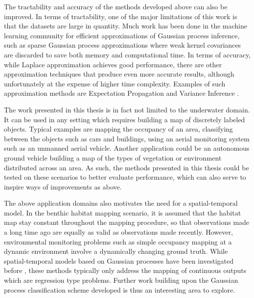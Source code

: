 	The tractability and accuracy of the methods developed above can also be improved. In terms of tractability, one of the major limitations of this work is that the datasets are large in quantity. Much work has been done in the machine learning community for efficient approximations of Gaussian process inference, such as sparse Gaussian process approximations where weak kernel covariances are discarded to save both memory and computational time. In terms of accuracy, while Laplace approximation achieves good performance, there are other approximation techniques that produce even more accurate results, although unfortunately at the expense of higher time complexity. Examples of such approximation methods are Expectation Propagation and Variance Inference \cite{GaussianProcessForMachineLearning}.
	
	The work presented in this thesis is in fact not limited to the underwater domain. It can be used in any setting which requires building a map of discretely labeled objects. Typical examples are mapping the occupancy of an area, classifying between the objects such as cars and buildings, using an aerial monitoring system such as an unmanned aerial vehicle. Another application could be an autonomous ground vehicle building a map of the types of vegetation or environment distributed across an area. As such, the methods presented in this thesis could be tested on these scenarios to better evaluate performance, which can also serve to inspire ways of improvements as above.
	
	The above application domains also motivates the need for a spatial-temporal model. In the benthic habitat mapping scenario, it is assumed that the habitat map stay constant throughout the mapping procedure, so that observations made a long time ago are equally as valid as observations made recently. However, environmental monitoring problems such as simple occupancy mapping at a dynamic environment involve a dynamically changing ground truth. While spatial-temporal models based on Gaussian processes have been investigated before \cite{Roman:SequentialBayesianOptimisation}, these methods typically only address the mapping of continuous outputs which are regression type problems. Further work building upon the Gaussian process classification scheme developed is thus an interesting area to explore.
	
	

	